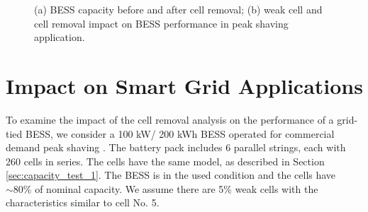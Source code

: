 \documentclass[10pt,twocolumn]{IEEEtran}
\begin{document}
\begin{figure}
\centering
\vspace{-0.2cm}
{} \vspace{-0.3cm}
\caption{ (a) BESS capacity before and after cell removal; (b) weak cell and cell removal impact on BESS  performance in  peak shaving application. }
\vspace{-0.4cm}
\label{fig:operation_impact}
\end{figure} 

\vspace{-0.3cm}
\section{Impact on Smart Grid Applications}

To examine the impact of the cell removal analysis on the performance of a grid-tied  BESS, 
we consider a 100 kW/ 200 kWh BESS operated for commercial demand peak shaving \cite{8051105}.
The battery pack includes 6 parallel strings,   each with 260 cells in series.
The cells have  the same model, as  described in Section \ref{sec:capacity_test_1}.
The BESS is in the used condition and the cells have $\sim	80\%$ of nominal capacity.
We assume  there are  5\%   weak cells with the characteristics similar to cell No. 5.
\end{document}
